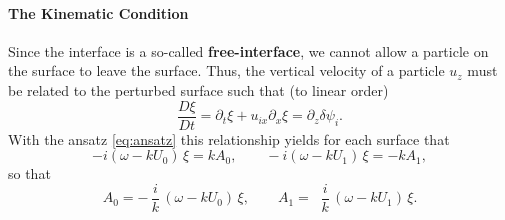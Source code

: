 \paragraph{The Kinematic Condition}
Since the interface is a so-called \textbf{free-interface}, we cannot allow a particle on the surface to leave the surface. Thus, the vertical velocity of a particle $u_z$ must be related to the perturbed surface such that (to linear order)
\[
\frac{D\xi}{Dt} = \partial_t \xi + u_{ix} \partial_x \xi = \partial_z \delta \psi_i.
\]
 With the ansatz \eqref{eq:ansatz} this relationship yields for each surface that
\begin{equation}
\label{eq:kinematic_amplitudes}
-i(\omega - k U_0)\,\xi = k A_0, \qquad
-i(\omega - k U_1)\,\xi = -k A_1,
\end{equation}
so that
\begin{equation}
\label{eq:A0A1}
A_0 = -\,\frac{i}{k}\,(\omega - k U_0)\,\xi, \qquad
A_1 = \;\;\frac{i}{k}\,(\omega - k U_1)\,\xi.
\end{equation}

